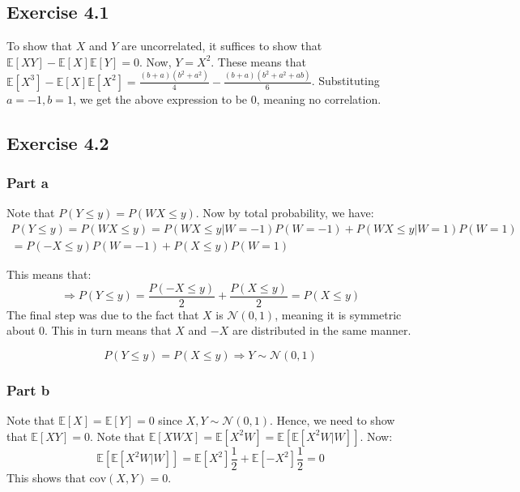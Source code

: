 \documentclass{article}
\begin{document}
\subsection*{Exercise 4.1}
\begin{flushleft}
To show that \(X\) and \(Y\) are uncorrelated, it suffices to show that \(\mathbb{E}[XY] - \mathbb{E}[X]\mathbb{E}[Y] = 0\). Now, \(Y = X^{2}\). These means that \(\mathbb{E}[X^3] - \mathbb{E}[X]\mathbb{E}[X^2] = \frac{(b + a)(b^2 + a^2)}{4} - \frac{(b + a)(b^2 + a^2 + ab)}{6}\). Substituting \(a = -1, b = 1\), we get the above expression to be \(0\), meaning no correlation.
\end{flushleft}

\subsection*{Exercise 4.2}
\subsubsection*{Part a}
\begin{flushleft}
Note that \(P(Y \leq y) = P(WX \leq y)\). Now by total probability, we have:
\begin{multline}
P(Y \leq y) = P(WX \leq y) = P(WX \leq y | W = -1)P(W = -1) + P(WX \leq y | W = 1)P(W = 1)\\= P(-X \leq y)P(W = -1) + P(X \leq y)P(W = 1)
\end{multline}

This means that:
\begin{equation}
\Rightarrow P(Y \leq y) = \frac{P(-X \leq y)}{2} + \frac{P(X \leq y)}{2} = P(X \leq y)
\end{equation}
The final step was due to the fact that \(X\) is \(\mathcal{N}(0, 1)\), meaning it is symmetric about 0. This in turn means that \(X\) and \(-X\) are distributed in the same manner.

\[P(Y \leq y) = P(X \leq y) \Rightarrow Y \sim \mathcal{N}(0, 1)\]
\end{flushleft}

\subsubsection*{Part b}
\begin{flushleft}
Note that \(\mathbb{E}[X] = \mathbb{E}[Y] = 0\) since \(X, Y \sim \mathcal{N}(0, 1)\). Hence, we need to show that \(\mathbb{E}[XY] = 0\). Note that \(\mathbb{E}[XWX] = \mathbb{E}[X^2W] = \mathbb{E}[\mathbb{E}[X^2W | W]]\). Now:
\begin{equation}
\mathbb{E}[\mathbb{E}[X^2W | W]] = \mathbb{E}[X^2] \frac{1}{2} + \mathbb{E}[-X^2] \frac{1}{2} = 0
\end{equation}
This shows that \(\mathrm{cov}(X, Y) = 0\).
\end{flushleft}
\end{document}
